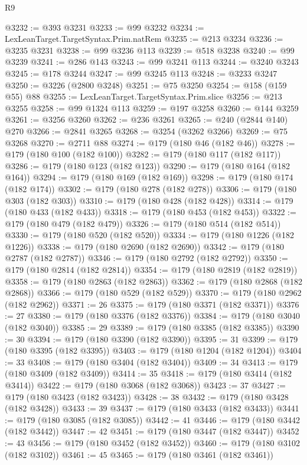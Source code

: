 \begin{lexlean}{R9}
\begin{coremodule}
@3232 := @393 @3231
@3233 := @99 @3232
@3234 := LexLeanTarget.TargetSyntax.Prim.natRem
@3235 := @213 @3234
@3236 := @3235 @3231
@3238 := @99 @3236 @113
@3239 := @518 @3238
@3240 := @99 @3239
@3241 := @286 @143
@3243 := @99 @3241 @113
@3244 := @3240 @3243
@3245 := @178 @3244
@3247 := @99 @3245 @113
@3248 := @3233 @3247
@3250 := @3226 (@2800 @3248)
@3251 := @75 @3250
@3254 := @158 (@159 @55) @88
@3255 := LexLeanTarget.TargetSyntax.Prim.slice
@3256 := @213 @3255
@3258 := @99 @1324 @113
@3259 := @197 @3258
@3260 := @144 @3259
@3261 := @3256 @3260
@3262 := @236 @3261
@3265 := @240 (@2844 @140) @270
@3266 := @2841 @3265
@3268 := @3254 (@3262 @3266)
@3269 := @75 @3268
@3270 := @2711 @88
@3274 := @179 (@180 @46 (@182 @46))
@3278 := @179 (@180 @100 (@182 @100))
@3282 := @179 (@180 @117 (@182 @117))
@3286 := @179 (@180 @123 (@182 @123))
@3290 := @179 (@180 @164 (@182 @164))
@3294 := @179 (@180 @169 (@182 @169))
@3298 := @179 (@180 @174 (@182 @174))
@3302 := @179 (@180 @278 (@182 @278))
@3306 := @179 (@180 @303 (@182 @303))
@3310 := @179 (@180 @428 (@182 @428))
@3314 := @179 (@180 @433 (@182 @433))
@3318 := @179 (@180 @453 (@182 @453))
@3322 := @179 (@180 @479 (@182 @479))
@3326 := @179 (@180 @514 (@182 @514))
@3330 := @179 (@180 @520 (@182 @520))
@3334 := @179 (@180 @1226 (@182 @1226))
@3338 := @179 (@180 @2690 (@182 @2690))
@3342 := @179 (@180 @2787 (@182 @2787))
@3346 := @179 (@180 @2792 (@182 @2792))
@3350 := @179 (@180 @2814 (@182 @2814))
@3354 := @179 (@180 @2819 (@182 @2819))
@3358 := @179 (@180 @2863 (@182 @2863))
@3362 := @179 (@180 @2868 (@182 @2868))
@3366 := @179 (@180 @529 (@182 @529))
@3370 := @179 (@180 @2962 (@182 @2962))
@3371 := 26
@3375 := @179 (@180 @3371 (@182 @3371))
@3376 := 27
@3380 := @179 (@180 @3376 (@182 @3376))
@3384 := @179 (@180 @3040 (@182 @3040))
@3385 := 29
@3389 := @179 (@180 @3385 (@182 @3385))
@3390 := 30
@3394 := @179 (@180 @3390 (@182 @3390))
@3395 := 31
@3399 := @179 (@180 @3395 (@182 @3395))
@3403 := @179 (@180 @1204 (@182 @1204))
@3404 := 33
@3408 := @179 (@180 @3404 (@182 @3404))
@3409 := 34
@3413 := @179 (@180 @3409 (@182 @3409))
@3414 := 35
@3418 := @179 (@180 @3414 (@182 @3414))
@3422 := @179 (@180 @3068 (@182 @3068))
@3423 := 37
@3427 := @179 (@180 @3423 (@182 @3423))
@3428 := 38
@3432 := @179 (@180 @3428 (@182 @3428))
@3433 := 39
@3437 := @179 (@180 @3433 (@182 @3433))
@3441 := @179 (@180 @3085 (@182 @3085))
@3442 := 41
@3446 := @179 (@180 @3442 (@182 @3442))
@3447 := 42
@3451 := @179 (@180 @3447 (@182 @3447))
@3452 := 43
@3456 := @179 (@180 @3452 (@182 @3452))
@3460 := @179 (@180 @3102 (@182 @3102))
@3461 := 45
@3465 := @179 (@180 @3461 (@182 @3461))

\end{coremodule}
\end{lexlean}
